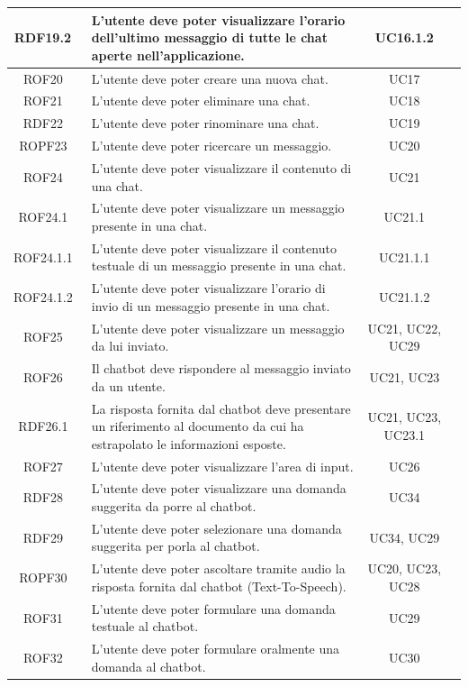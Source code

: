 \documentclass[10pt, a4paper]{article}
\begin{document}
\begin{xltabular}{\textwidth}{|c|X|c|c}
\hline RDF19.2\ & L'utente deve poter visualizzare l'orario dell'ultimo messaggio di tutte le chat aperte nell'applicazione. & UC16.1.2 \\
\hline ROF20\ & L'utente deve poter creare una nuova chat. & UC17 \\
\hline ROF21\ & L'utente deve poter eliminare una chat. & UC18 \\
\hline RDF22\ & L'utente deve poter rinominare una chat. & UC19 \\
\hline ROPF23\ & L'utente deve poter ricercare un messaggio. & UC20 \\
\hline ROF24\ & L'utente deve poter visualizzare il contenuto di una chat. & UC21 \\
\hline ROF24.1\ & L'utente deve poter visualizzare un messaggio presente in una chat. & UC21.1 \\
\hline ROF24.1.1\ & L'utente deve poter visualizzare il contenuto testuale di un messaggio presente in una chat. & UC21.1.1 \\
\hline ROF24.1.2\ & L'utente deve poter visualizzare l'orario di invio di un messaggio presente in una chat. & UC21.1.2 \\
\hline ROF25\ & L'utente deve poter visualizzare un messaggio da lui inviato. & UC21, UC22, UC29 \\
\hline ROF26\ & Il chatbot deve rispondere al messaggio inviato da un utente. & UC21, UC23 \\
\hline RDF26.1\ & La risposta fornita dal chatbot deve presentare un riferimento al documento da cui ha estrapolato le informazioni esposte. & UC21, UC23, UC23.1 \\
\hline ROF27\ & L'utente deve poter visualizzare l'area di input. & UC26 \\
\hline RDF28\ & L'utente deve poter visualizzare una domanda suggerita da porre al chatbot. & UC34 \\
\hline RDF29\ & L'utente deve poter selezionare una domanda suggerita per porla al chatbot. & UC34, UC29 \\
\hline ROPF30\ & L'utente deve poter ascoltare tramite audio la risposta fornita dal chatbot (Text-To-Speech). & UC20, UC23, UC28 \\ 
\hline ROF31\ & L'utente deve poter formulare una domanda testuale al chatbot. & UC29 \\
\hline ROF32\ & L'utente deve poter formulare oralmente una domanda al chatbot. & UC30 \\
\hline
\end{xltabular}
\end{document}
